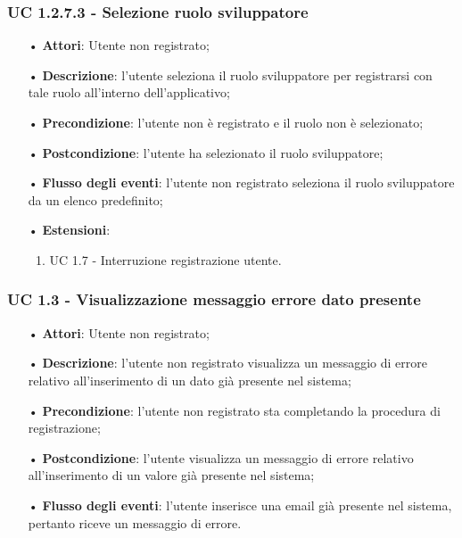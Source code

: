 \subsubsection{UC 1.2.7.3 - Selezione ruolo sviluppatore}
\begin{itemize}
	\item[•]\textbf{Attori}: Utente non registrato;
	\item[•]\textbf{Descrizione}: l'utente seleziona il ruolo sviluppatore per registrarsi con tale ruolo all'interno dell'applicativo;
	\item[•]\textbf{Precondizione}: l'utente non è registrato e il ruolo non è selezionato;
	\item[•]\textbf{Postcondizione}: l'utente ha selezionato il ruolo sviluppatore;
	\item[•]\textbf{Flusso degli eventi}: l'utente non registrato seleziona il ruolo sviluppatore da un elenco predefinito;
	\item[•]\textbf{Estensioni}:
	\begin{enumerate}
		\item UC 1.7 - Interruzione registrazione utente.
	\end{enumerate}
\end{itemize}


\subsubsection{UC 1.3 - Visualizzazione messaggio errore dato presente}
\begin{itemize}
	\item[•]\textbf{Attori}: Utente non registrato;
	\item[•]\textbf{Descrizione}: l'utente non registrato visualizza un messaggio di errore relativo all'inserimento
	di un dato già presente nel sistema;
	\item[•]\textbf{Precondizione}: l'utente non registrato sta completando la procedura di registrazione;
	\item[•]\textbf{Postcondizione}: l'utente visualizza un messaggio di errore relativo all'inserimento di un valore già presente nel sistema;
	\item[•]\textbf{Flusso degli eventi}: l'utente inserisce una email già presente nel sistema, pertanto riceve un messaggio di errore.
\end{itemize}

